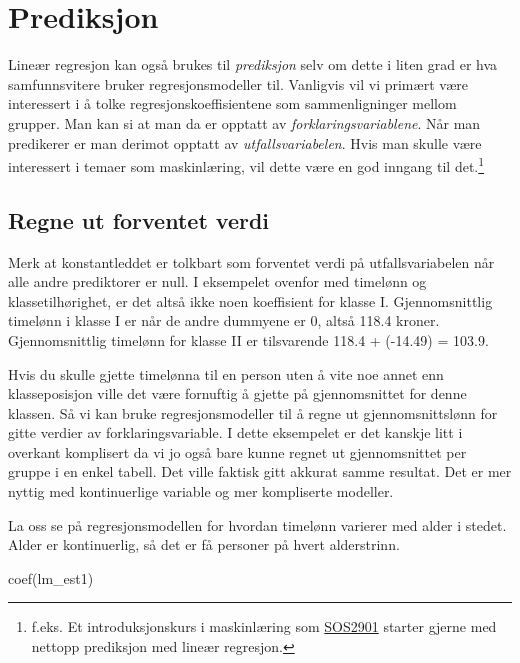 \documentclass[
  norsk,
  letterpaper,
  DIV=11,
  numbers=noendperiod]{scrreprt}
\newenvironment{Shaded}{\begin{snugshade}}{\end{snugshade}}
\newcommand{\FunctionTok}[1]{\textcolor[rgb]{0.28,0.35,0.67}{#1}}
\newcommand{\NormalTok}[1]{\textcolor[rgb]{0.00,0.23,0.31}{#1}}
\theoremstyle{definition}
\theoremstyle{remark}
\begin{document}
\section{Prediksjon}\label{prediksjon}

Lineær regresjon kan også brukes til \emph{prediksjon} selv om dette i
liten grad er hva samfunnsvitere bruker regresjonsmodeller til.
Vanligvis vil vi primært være interessert i å tolke
regresjonskoeffisientene som sammenligninger mellom grupper. Man kan si
at man da er opptatt av \emph{forklaringsvariablene}. Når man predikerer
er man derimot opptatt av \emph{utfallsvariabelen}. Hvis man skulle være
interessert i temaer som maskinlæring, vil dette være en god inngang til
det.\footnote{f.eks. Et introduksjonskurs i maskinlæring som
  \href{https://www.uio.no/studier/emner/sv/iss/SOS2901/index.html}{SOS2901}
  starter gjerne med nettopp prediksjon med lineær regresjon.}

\subsection{Regne ut forventet verdi}\label{regne-ut-forventet-verdi}

Merk at konstantleddet er tolkbart som forventet verdi på
utfallsvariabelen når alle andre prediktorer er null. I eksempelet
ovenfor med timelønn og klassetilhørighet, er det altså ikke noen
koeffisient for klasse I. Gjennomsnittlig timelønn i klasse I er når de
andre dummyene er 0, altså 118.4 kroner. Gjennomsnittlig timelønn for
klasse II er tilsvarende 118.4 + (-14.49) = 103.9.

Hvis du skulle gjette timelønna til en person uten å vite noe annet enn
klasseposisjon ville det være fornuftig å gjette på gjennomsnittet for
denne klassen. Så vi kan bruke regresjonsmodeller til å regne ut
gjennomsnittslønn for gitte verdier av forklaringsvariable. I dette
eksempelet er det kanskje litt i overkant komplisert da vi jo også bare
kunne regnet ut gjennomsnittet per gruppe i en enkel tabell. Det ville
faktisk gitt akkurat samme resultat. Det er mer nyttig med kontinuerlige
variable og mer kompliserte modeller.

La oss se på regresjonsmodellen for hvordan timelønn varierer med alder
i stedet. Alder er kontinuerlig, så det er få personer på hvert
alderstrinn.

\begin{Shaded}
\begin{Highlighting}[]
\FunctionTok{coef}\NormalTok{(lm\_est1)}
\end{Highlighting}
\end{Shaded}
\end{document}
